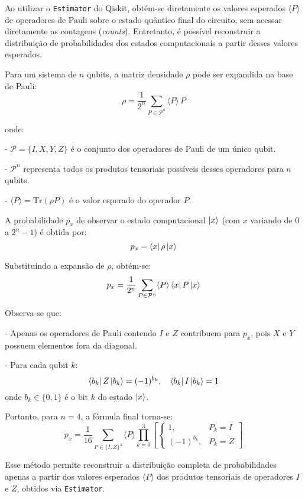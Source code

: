 \label{ap: apendiceD}

Ao utilizar o \texttt{Estimator} do Qiskit, obtém-se diretamente os valores esperados \(\langle P \rangle\) de operadores de Pauli sobre o estado quântico final do circuito, sem acessar diretamente as contagens (\textit{counts}). Entretanto, é possível reconstruir a distribuição de probabilidades dos estados computacionais a partir desses valores esperados.

Para um sistema de \(n\) qubits, a matriz densidade \(\rho\) pode ser expandida na base de Pauli:
%
\[
\rho = \frac{1}{2^n} \sum_{P \in \mathcal{P}^n} \langle P \rangle \, P
\]

onde:

- \(\mathcal{P} = \{I, X, Y, Z\}\) é o conjunto dos operadores de Pauli de um único qubit.

- \(\mathcal{P}^n\) representa todos os produtos tensoriais possíveis desses operadores
para \(n\) qubits.

- \(\langle P \rangle = \mathrm{Tr}(\rho P)\) é o valor esperado do operador \(P\).

A probabilidade \(p_x\) de observar o estado computacional \(\ket{x}\) (com \(x\) variando de \(0\) a \(2^n-1\)) é obtida por:
%
\[
p_x = \bra{x} \rho \ket{x}
\]

Substituindo a expansão de \(\rho\), obtém-se:
%
\[
p_x = \frac{1}{2^n} \sum_{P \in \mathcal{P}^n} \langle P \rangle \bra{x} P \ket{x}
\]

Observa-se que:

- Apenas os operadores de Pauli contendo \(I\) e \(Z\) contribuem para \(p_x\), pois \(X\) e \(Y\) possuem elementos fora da diagonal.

- Para cada qubit \(k\):
\[
\bra{b_k} Z \ket{b_k} = (-1)^{b_k}, \quad \bra{b_k} I \ket{b_k} = 1
\]
onde \(b_k \in \{0,1\}\) é o bit \(k\) do estado \(\ket{x}\).

Portanto, para \(n=4\), a fórmula final torna-se:
%
\[
p_x = \frac{1}{16} \sum_{P \in \{I,Z\}^4} \langle P \rangle \prod_{k=0}^{3} \left[ 
\begin{cases}
1, & P_k = I \\
(-1)^{b_k}, & P_k = Z
\end{cases} \right]
\]

Esse método permite reconstruir a distribuição completa de probabilidades apenas a partir dos valores esperados \(\langle P \rangle\) dos produtos tensoriais de operadores \(I\) e \(Z\), obtidos via \texttt{Estimator}.

